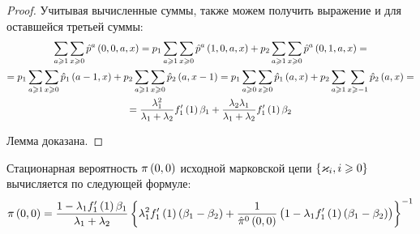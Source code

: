 \documentclass[a4paper,14pt,russian]{article}
\newcommand{\Markk}[0]{\brrr{ \vk_i, i \geqslant 0}}
\newcommand{\p}{\hat{p}}
\begin{document}
\begin{proof}
Учитывая вычисленные суммы, также можем получить выражение и для оставшейся третьей суммы:
\begin{multline*}
 \sum_{a\geqslant 1}\sum_{x\geqslant 0}\p^a\br{0,0,a,x} = p_1  \sum_{a\geqslant 1}\sum_{x\geqslant 0}\p^a\br{1,0,a,x} + 
p_2  \sum_{a\geqslant 1}\sum_{x\geqslant 0}\p^a\br{0,1,a,x} =  \\= p_1  \sum_{a\geqslant 1}\sum_{x\geqslant 0}\p_1\br{a-1,x} + 
p_2  \sum_{a\geqslant 1}\sum_{x\geqslant 0}\p_2\br{a,x-1} = p_1  \sum_{a\geqslant 0}\sum_{x\geqslant 0}\p_1\br{a,x} + 
p_2  \sum_{a\geqslant 1}\sum_{x\geqslant -1}\p_2\br{a,x} = \\ =\frac{\la_1^2}{\la_1+\la_2} f_1'\br{1} \beta_1 + \frac{\la_2 \la_1}{\la_1+ \la_2}
 f_1'\br{1} \beta_2
\end{multline*}

Лемма доказана.
\end{proof}

\begin{lemma}
 Стационарная вероятность $\pi\left(0,0\right)$ исходной марковской цепи $\Markk$ вычисляется по следующей формуле:
 \begin{equation}
  \pi\left(0,0\right) = 
  \frac{  1 -\lambda_1 f_1'\left(1\right) \beta_1}{\lambda_1 + \lambda_2} \left\{\lambda_1^2 f_1'\left(1\right)\left( \beta_1 - \beta_2\right) + \frac{1}{\hat{\pi}^0\left(0,0\right)}
 \left(1 - \lambda_1 f_1'\left(1\right) \left(\beta_1 - \beta_2\right) \right)\right\}^{-1}
\end{equation}
\end{lemma}
\end{document}
